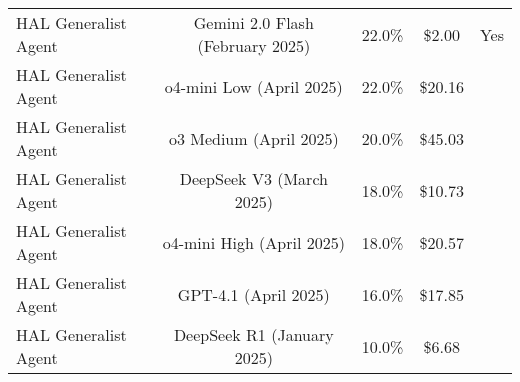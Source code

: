 \begin{tabular}{lcccc}
HAL Generalist Agent & Gemini 2.0 Flash (February 2025) & 22.0\% & \$2.00 & Yes \\
HAL Generalist Agent & o4-mini Low (April 2025) & 22.0\% & \$20.16 &  \\
HAL Generalist Agent & o3 Medium (April 2025) & 20.0\% & \$45.03 &  \\
HAL Generalist Agent & DeepSeek V3 (March 2025) & 18.0\% & \$10.73 &  \\
HAL Generalist Agent & o4-mini High (April 2025) & 18.0\% & \$20.57 &  \\
HAL Generalist Agent & GPT-4.1 (April 2025) & 16.0\% & \$17.85 &  \\
HAL Generalist Agent & DeepSeek R1 (January 2025) & 10.0\% & \$6.68 &  \\
\bottomrule
\end{tabular}